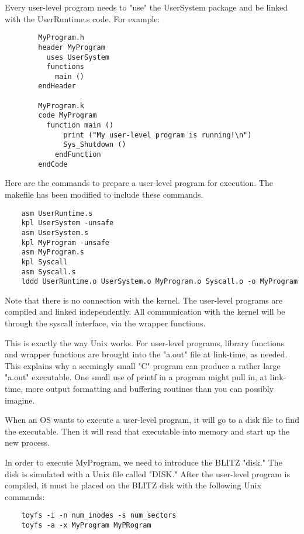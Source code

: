 \documentclass[12pt]{article}
\begin{document}
Every user-level program needs to "use" the UserSystem package and be
linked with the UserRuntime.s code.  For example:

\begin{verbatim}
        MyProgram.h
        header MyProgram
          uses UserSystem
          functions
            main ()
        endHeader

        MyProgram.k
        code MyProgram
          function main ()
              print ("My user-level program is running!\n")
              Sys_Shutdown ()
            endFunction
        endCode
\end{verbatim}

Here are the commands to prepare a user-level program for execution.
The makefile has been modified to include these commands.

\begin{verbatim}
    asm UserRuntime.s
    kpl UserSystem -unsafe
    asm UserSystem.s
    kpl MyProgram -unsafe
    asm MyProgram.s
    kpl Syscall
    asm Syscall.s
    lddd UserRuntime.o UserSystem.o MyProgram.o Syscall.o -o MyProgram
\end{verbatim}

Note that there is no connection with the kernel.  The user-level
programs are compiled and linked independently.  All communication
with the kernel will be through the syscall interface, via the wrapper
functions.

This is exactly the way Unix works.  For user-level programs, library
functions and wrapper functions are brought into the "a.out" file at
link-time, as needed.  This explains why a seemingly small "C" program
can produce a rather large "a.out" executable.  One small use of
printf in a program might pull in, at link-time, more output
formatting and buffering routines than you can possibly imagine.

When an OS wants to execute a user-level program, it will go to a disk
file to find the executable.  Then it will read that executable into
memory and start up the new process.

In order to execute MyProgram, we need to introduce the BLITZ "disk."
The disk is simulated with a Unix file called "DISK."  After the
user-level program is compiled, it must be placed on the BLITZ disk
with the following Unix commands:

\begin{verbatim}
    toyfs -i -n num_inodes -s num_sectors
    toyfs -a -x MyProgram MyPRogram
\end{verbatim}
\end{document}
